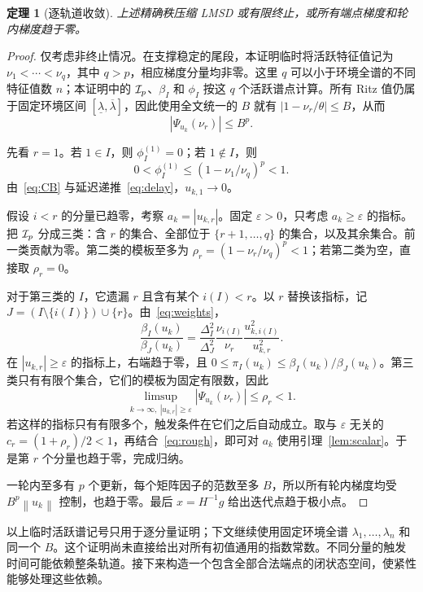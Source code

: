 \documentclass[UTF8,zihao=-4,a4paper]{ctexart}
\newtheorem{theorem}{定理}[section]
\theoremstyle{definition}\newtheorem{example}[theorem]{例}
\newcommand{\norm}[1]{\left\lVert#1\right\rVert}
\newcommand{\abs}[1]{\left|#1\right|}
\begin{document}
\begin{theorem}[逐轨道收敛]\label{thm:global}
上述精确秩压缩 LMSD 或有限终止，或所有端点梯度和轮内梯度趋于零。
\end{theorem}
\begin{proof}
仅考虑非终止情况。在支撑稳定的尾段，本证明临时将活跃特征值记为 $\nu_1<\cdots<\nu_q$，其中 $q>p$，相应梯度分量均非零。这里 $q$ 可以小于环境全谱的不同特征值数 $n$；本证明中的 $\mathcal I_p$、$\beta_I$ 和 $\phi_I$ 按这 $q$ 个活跃谱点计算。所有 Ritz 值仍属于固定环境区间 $[\underline\lambda,\overline\lambda]$，因此使用全文统一的 $B$ 就有 $\abs{1-\nu_r/\theta}\le B$，从而
\begin{equation}\label{eq:rough}
 \abs{\Psi_{u_k}(\nu_r)}\le B^p.
\end{equation}

先看 $r=1$。若 $1\in I$，则 $\phi_I^{(1)}=0$；若 $1\notin I$，则
\[
 0<\phi_I^{(1)}\le(1-\nu_1/\nu_q)^p<1.
\]
由~\eqref{eq:CB} 与延迟递推~\eqref{eq:delay}，$u_{k,1}\to0$。

假设 $i<r$ 的分量已趋零，考察 $a_k=|u_{k,r}|$。固定 $\varepsilon>0$，只考虑 $a_k\ge\varepsilon$ 的指标。把 $\mathcal I_p$ 分成三类：含 $r$ 的集合、全部位于 $\{r+1,\ldots,q\}$ 的集合，以及其余集合。前一类贡献为零。第二类的模板至多为
$\rho_r=(1-\nu_r/\nu_q)^p<1$；若第二类为空，直接取 $\rho_r=0$。

对于第三类的 $I$，它遗漏 $r$ 且含有某个 $i(I)<r$。以 $r$ 替换该指标，记
$J=(I\setminus\{i(I)\})\cup\{r\}$。由~\eqref{eq:weights}，
\begin{equation}\label{eq:exchange}
 \frac{\beta_I(u_k)}{\beta_J(u_k)}
 =\frac{\Delta_I^2}{\Delta_J^2}
   \frac{\nu_{i(I)}}{\nu_r}
   \frac{u_{k,i(I)}^2}{u_{k,r}^2}.
\end{equation}
在 $|u_{k,r}|\ge\varepsilon$ 的指标上，右端趋于零，且
$0\le\pi_I(u_k)\le\beta_I(u_k)/\beta_J(u_k)$。第三类只有有限个集合，它们的模板为固定有限数，因此
\[
 \limsup_{k\to\infty,\ |u_{k,r}|\ge\varepsilon}
       |\Psi_{u_k}(\nu_r)|\le\rho_r<1.
\]
若这样的指标只有有限多个，触发条件在它们之后自动成立。取与 $\varepsilon$ 无关的
$c_r=(1+\rho_r)/2<1$，再结合~\eqref{eq:rough}，即可对 $a_k$ 使用引理~\ref{lem:scalar}。于是第 $r$ 个分量也趋于零，完成归纳。

一轮内至多有 $p$ 个更新，每个矩阵因子的范数至多 $B$，所以所有轮内梯度均受 $B^p\norm{u_k}$ 控制，也趋于零。最后 $x=H^{-1}g$ 给出迭代点趋于极小点。
\end{proof}

以上临时活跃谱记号只用于逐分量证明；下文继续使用固定环境全谱 $\lambda_1,\ldots,\lambda_n$ 和同一个 $B$。这个证明尚未直接给出对所有初值通用的指数常数。不同分量的触发时间可能依赖整条轨道。接下来构造一个包含全部合法端点的闭状态空间，使紧性能够处理这些依赖。
\end{document}
